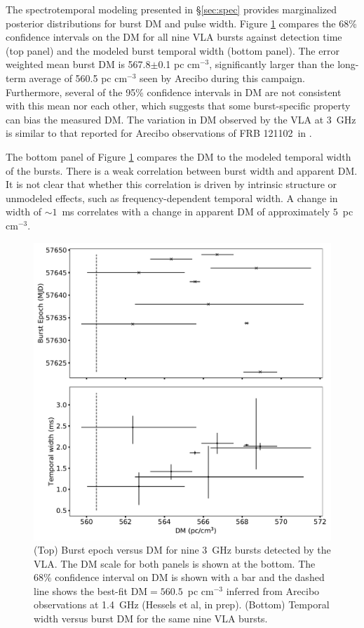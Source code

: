 \documentclass[twocolumn]{aastex61}
\newcommand{\frb}{FRB 121102}
\begin{document}
The spectrotemporal modeling presented in \S \ref{sec:spec} provides marginalized posterior distributions for burst DM and pulse width. Figure \ref{fig:dmdt} compares the 68\% confidence intervals on the DM for all nine VLA bursts against detection time (top panel) and the modeled burst temporal width (bottom panel). The error weighted mean burst DM is 567.8$\pm$0.1 pc cm$^{-3}$, significantly larger than the long-term average of 560.5 pc cm$^{-3}$ seen by Arecibo during this campaign. Furthermore, several of the 95\% confidence intervals in DM are not consistent with this mean nor each other, which suggests that some burst-specific property can bias the measured DM. The variation in DM observed by the VLA at 3~GHz is similar to that reported for Arecibo observations of \frb\ in \citet{2016Natur.531..202S, 2016arXiv160308880S}.

The bottom panel of Figure \ref{fig:dmdt} compares the DM to the modeled temporal width of the bursts. There is a weak correlation between burst width and apparent DM. It is not clear that whether this correlation is driven by intrinsic structure or unmodeled effects, such as frequency-dependent temporal width. A change in width of $\sim1$~ms correlates with a change in apparent DM of approximately $5$~pc cm$^{-3}$.

\begin{figure}[htb]
\begin{center}
\includegraphics[width=\columnwidth]{burst_dmdt.pdf}
\caption{(Top) Burst epoch versus DM for nine 3~GHz bursts detected by the VLA. The DM scale for both panels is shown at the bottom. The 68\% confidence interval on DM is shown with a bar and the dashed line shows the best-fit DM$=560.5$\ pc cm$^{-3}$ inferred from Arecibo observations at 1.4~GHz (Hessels et al, in prep). (Bottom) Temporal width versus burst DM for the same nine VLA bursts.
\label{fig:dmdt}}
\end{center}
\end{figure}
\end{document}
